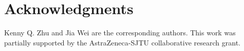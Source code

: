 \documentclass[10pt,doc,floatsintext,apacite]{apa6}
\begin{document}


\section*{Acknowledgments}
Kenny Q. Zhu and Jia Wei are the corresponding authors. This work
was partially supported by the AstraZeneca-SJTU collaborative
research grant.

%

\end{document}
